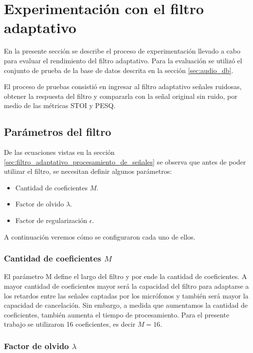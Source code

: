 \section{Experimentación con el filtro adaptativo}

En la presente sección se describe el proceso de experimentación llevado a cabo para evaluar el rendimiento del filtro adaptativo. Para la evaluación se utilizó el conjunto de prueba de la base de datos descrita en la sección \ref{sec:audio_db}.

El proceso de pruebas consistió en ingresar al filtro adaptativo señales ruidosas, obtener la respuesta del filtro y compararla con la señal original sin ruido, por medio de las métricas STOI y PESQ.

\subsection{Parámetros del filtro}

De las ecuaciones vistas en la sección \ref{sec:filtro_adaptativo_procesamiento_de_señales} se observa que antes de poder utilizar el filtro, se necesitan definir algunos parámetros:

\begin{itemize}
	\item Cantidad de coeficientes $M$.
	\item Factor de olvido $\lambda$.
	\item Factor de regularización $\epsilon$.
\end{itemize}


A continuación veremos cómo se configuraron cada uno de ellos.

\subsubsection{Cantidad de coeficientes $M$}

El parámetro M define el largo del filtro y por ende la cantidad de coeficientes. A mayor cantidad de coeficientes mayor será la capacidad del filtro para adaptarse a los retardos entre las señales captadas por los micrófonos y también será mayor la capacidad de cancelación. Sin embargo, a medida que aumentamos la cantidad de coeficientes, también aumenta el tiempo de procesamiento. Para el presente trabajo se utilizaron 16 coeficientes, es decir $M=16$.

\subsubsection{Factor de olvido $\lambda$}

